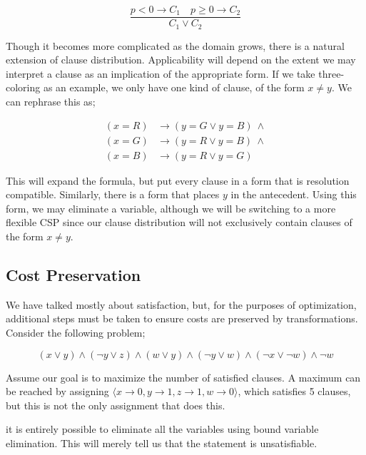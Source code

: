\begin{equation}\label{equation:binary-resolution-Z}
\frac{p < 0 \rightarrow C_1 \quad p \geq 0 \rightarrow C_2}{C_1 \lor C_2}
\end{equation}

Though it becomes more complicated as the domain grows, there is a natural extension of clause distribution. Applicability will depend on the extent we may interpret a clause as an implication of the appropriate form. If we take three-coloring as an example, we only have one kind of clause, of the form $x \neq y$. We can rephrase this as;

\begin{align}
    (x = R) &\rightarrow (y = G \vee y = B)\ \wedge \nonumber \\
    (x = G) &\rightarrow (y = R \vee y = B)\ \wedge \nonumber \\
    (x = B) &\rightarrow (y = R \vee y = G)\label{eq:multiline}
\end{align}

This will expand the formula, but put every clause in a form that is resolution compatible. Similarly, there is a form that places $y$ in the antecedent. Using this form, we may eliminate a variable, although we will be switching to a more flexible CSP since our clause distribution will not exclusively contain clauses of the form $x \neq y$.

\subsection{Cost Preservation}\label{sec:cost-preservation}

We have talked mostly about satisfaction, but, for the purposes of optimization, additional steps must be taken to ensure costs are preserved by transformations. Consider the following problem;

\begin{equation}
    (x \vee y) \wedge (\neg y \vee z) \wedge (w \vee y) \wedge (\neg y \vee w) \wedge (\neg x \vee \neg w) \wedge \neg w
\end{equation}

Assume our goal is to maximize the number of satisfied clauses. A maximum can be reached by assigning $\langle x \rightarrow 0, y \rightarrow 1, z \rightarrow 1, w \rightarrow 0 \rangle$, which satisfies 5 clauses, but this is not the only assignment that does this. 

it is entirely possible to eliminate all the variables using bound variable elimination. This will merely tell us that the statement is unsatisfiable.

